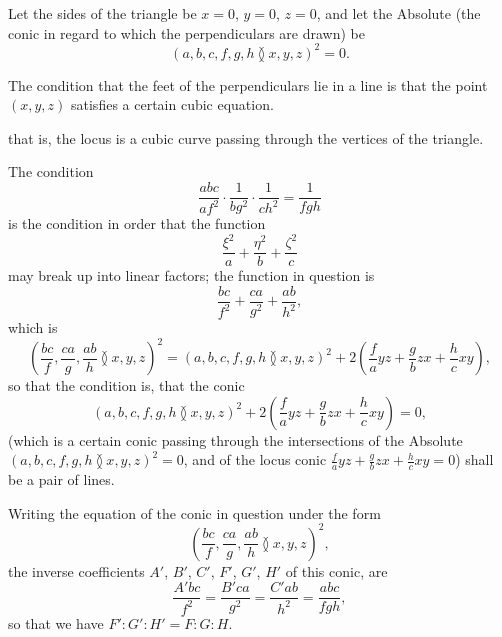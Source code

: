 \documentclass[11pt,a4paper]{article}
\theoremstyle{plain}
\begin{document}
Let the sides of the triangle be $x = 0$, $y = 0$, $z = 0$, and let the Absolute (the conic in regard to which the perpendiculars are drawn) be
\begin{equation}
(a, b, c, f, g, h \between x, y, z)^2 = 0.
\end{equation}

The condition that the feet of the perpendiculars lie in a line is that the point $(x, y, z)$ satisfies a certain cubic equation.

\newpage
\setcounter{equation}{2}

that is, the locus is a cubic curve passing through the vertices of the triangle.

The condition
\begin{equation}
\frac{abc}{af^2} \cdot \frac{1}{bg^2} \cdot \frac{1}{ch^2} = \frac{1}{fgh}
\end{equation}
is the condition in order that the function
\begin{equation}
\frac{\xi^2}{a} + \frac{\eta^2}{b} + \frac{\zeta^2}{c}
\end{equation}
may break up into linear factors; the function in question is
\begin{equation}
\frac{bc}{f^2} + \frac{ca}{g^2} + \frac{ab}{h^2},
\end{equation}
which is
\begin{equation}
\left(\frac{bc}{f}, \frac{ca}{g}, \frac{ab}{h} \between x, y, z\right)^2 = (a, b, c, f, g, h \between x, y, z)^2 + 2\left(\frac{f}{a}yz + \frac{g}{b}zx + \frac{h}{c}xy\right),
\end{equation}
so that the condition is, that the conic
\begin{equation}
(a, b, c, f, g, h \between x, y, z)^2 + 2\left(\frac{f}{a}yz + \frac{g}{b}zx + \frac{h}{c}xy\right) = 0,
\end{equation}
(which is a certain conic passing through the intersections of the Absolute $(a, b, c, f, g, h \between x, y, z)^2 = 0$, and of the locus conic $\frac{f}{a}yz + \frac{g}{b}zx + \frac{h}{c}xy = 0$) shall be a pair of lines.

\newpage
\setcounter{equation}{7}

Writing the equation of the conic in question under the form
\begin{equation}
\left(\frac{bc}{f}, \frac{ca}{g}, \frac{ab}{h} \between x, y, z\right)^2,
\end{equation}
the inverse coefficients $A'$, $B'$, $C'$, $F'$, $G'$, $H'$ of this conic, are
\begin{equation}
\frac{A'bc}{f^2} = \frac{B'ca}{g^2} = \frac{C'ab}{h^2} = \frac{abc}{fgh},
\end{equation}
so that we have $F' : G' : H' = F : G : H$.
\end{document}
